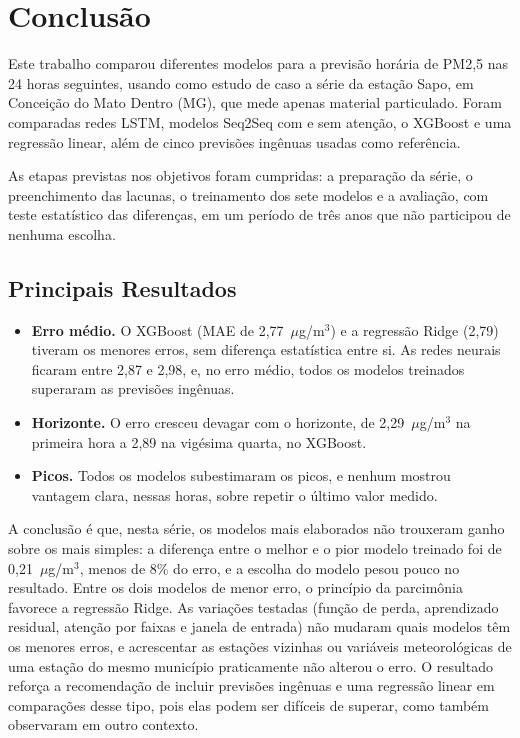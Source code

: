 \chapter{Conclusão}
\label{chap:conclusao}

Este trabalho comparou diferentes modelos para a previsão horária de PM2,5 nas 24 horas seguintes, usando como estudo de caso a série da estação Sapo, em Conceição do Mato Dentro (MG), que mede apenas material particulado. Foram comparadas redes LSTM, modelos Seq2Seq com e sem atenção, o XGBoost e uma regressão linear, além de cinco previsões ingênuas usadas como referência.

As etapas previstas nos objetivos foram cumpridas: a preparação da série, o preenchimento das lacunas, o treinamento dos sete modelos e a avaliação, com teste estatístico das diferenças, em um período de três anos que não participou de nenhuma escolha.

\section{Principais Resultados}

\begin{itemize}
    \item \textbf{Erro médio.} O XGBoost (MAE de 2,77~\(\mu\)g/m\(^3\)) e a regressão Ridge (2,79) tiveram os menores erros, sem diferença estatística entre si. As redes neurais ficaram entre 2,87 e 2,98, e, no erro médio, todos os modelos treinados superaram as previsões ingênuas.
    \item \textbf{Horizonte.} O erro cresceu devagar com o horizonte, de 2,29~\(\mu\)g/m\(^3\) na primeira hora a 2,89 na vigésima quarta, no XGBoost.
    \item \textbf{Picos.} Todos os modelos subestimaram os picos, e nenhum mostrou vantagem clara, nessas horas, sobre repetir o último valor medido.
\end{itemize}

A conclusão é que, nesta série, os modelos mais elaborados não trouxeram ganho sobre os mais simples: a diferença entre o melhor e o pior modelo treinado foi de 0,21~\(\mu\)g/m\(^3\), menos de 8\% do erro, e a escolha do modelo pesou pouco no resultado. Entre os dois modelos de menor erro, o princípio da parcimônia favorece a regressão Ridge. As variações testadas (função de perda, aprendizado residual, atenção por faixas e janela de entrada) não mudaram quais modelos têm os menores erros, e acrescentar as estações vizinhas ou variáveis meteorológicas de uma estação do mesmo município praticamente não alterou o erro. O resultado reforça a recomendação de incluir previsões ingênuas e uma regressão linear em comparações desse tipo, pois elas podem ser difíceis de superar, como também observaram  em outro contexto.

